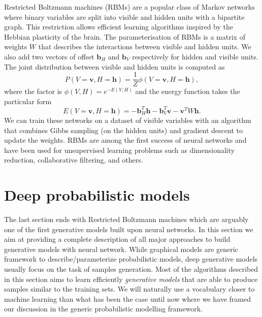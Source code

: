 Restricted Boltzmann machines (RBMs) are a popular class of Markov networks where binary variables are split into visible and hidden units with a bipartite graph. This restriction allows efficient learning algorithms inspired by the Hebbian plasticity of the brain. The parameterisation of RBMs is a matrix of weights $W$ that describes the interactions between visible and hidden units. We also add two vectors of offset $\bm{b}_H$ and $\bm{b}_V$ respectively for hidden and visible units. The joint distribution between visible and hidden units is computed as
$$ P(V=\bm{v}, H=\bm{h}) = \frac{1}{Z} \phi(V=\bm{v}, H=\bm{h}), $$
where the factor is $ \phi(V, H)=e^{-E(V, H)} $ and the energy function takes the particular form
$$ E(V=\bm{v}, H=\bm{h}) = -\bm{b}_H^T \bm{h} - \bm{b}_V^T \bm{v} - \bm{v}^T W \bm{h}.  $$
We can train these networks on a dataset of visible variables with an algorithm that combines Gibbs sampling (on the hidden units) and gradient descent to update the weights. RBMs are among the first success of neural networks and have been used for unsupervised learning problems such as dimensionality reduction, collaborative filtering, and others.
%
%
%

\section{Deep probabilistic models}
The last section ends with Restricted Boltzmann machines which are arguably one of the first generative models built upon neural networks. In this section we aim at providing a complete description of all major approaches to build generative models with neural network. While graphical models are generic framework to describe/parameterize probabilistic models, deep generative models usually focus on the task of samples generation. Most of the algorithms described in this section aims to learn efficiently \textit{generative models} that are able to produce samples similar to the training sets. We will naturally use a vocabulary closer to machine learning than what has been the case until now where we have framed our discussion in the generic probabilistic modelling framework.


